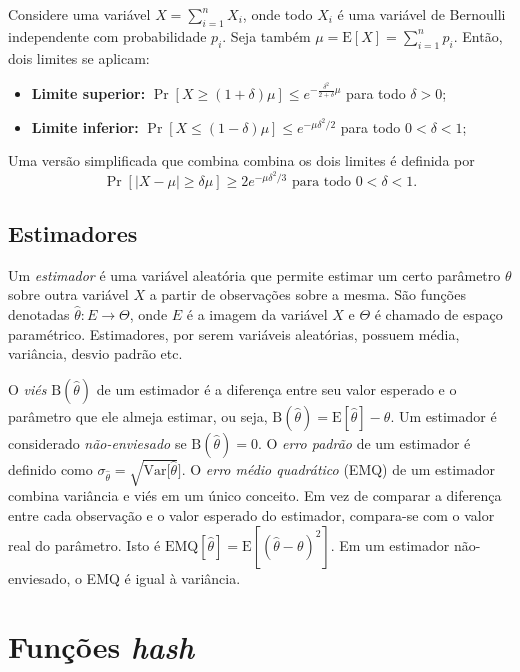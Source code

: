 Considere uma variável $X = \sum_{i=1}^n X_i$, onde todo $X_i$ é uma variável de Bernoulli independente com probabilidade $p_i$. Seja também $\mu = \text{E}[X] = \sum_{i=1}^n p_i$. Então, dois limites se aplicam:

\begin{itemize}
  \item \textbf{Limite superior:} $\Pr[X \geq (1 + \delta)\mu] \leq e^{-\frac{\delta^2}{2+\delta}\mu}$ para todo $\delta > 0$;
  \item \textbf{Limite inferior:} $\Pr[X \leq (1 - \delta)\mu] \leq e^{-\mu\delta^2/2}$ para todo $0 < \delta < 1$;
\end{itemize}

Uma versão simplificada que combina combina os dois limites é definida por
\[
    \Pr[|X - \mu| \geq \delta\mu] \geq 2e^{-\mu\delta^2/3}\text{ para todo } 0 < \delta < 1.
\]

\subsection{Estimadores}

Um \emph{estimador} é uma variável aleatória que permite estimar um certo parâmetro $\theta$ sobre outra variável $X$ a partir de observações sobre a mesma. São funções denotadas $\hat{\theta} : E \to \Theta$, onde $E$ é a imagem da variável $X$ e $\Theta$ é chamado de espaço paramétrico. Estimadores, por serem variáveis aleatórias, possuem média, variância, desvio padrão etc.

O \emph{viés} $\text{B}(\hat{\theta})$ de um estimador é a diferença entre seu valor esperado e o parâmetro que ele almeja estimar, ou seja, $\text{B}(\hat{\theta}) = \text{E}[\hat{\theta}] - \theta$. Um estimador é considerado \emph{não-enviesado} se $\text{B}(\hat{\theta}) = 0$. O \emph{erro padrão} de um estimador é definido como $\sigma_{\hat{\theta}} = \sqrt{\text{Var}[\hat{\theta}}]$. O \emph{erro médio quadrático} (EMQ) de um estimador combina variância e viés em um único conceito. Em vez de comparar a diferença entre cada observação e o valor esperado do estimador, compara-se com o valor real do parâmetro. Isto é $\text{EMQ}[\hat{\theta}] = \text{E}[(\hat{\theta} - \theta)^2]$. Em um estimador não-enviesado, o EMQ é igual à variância.

\section{Funções \emph{hash}}

